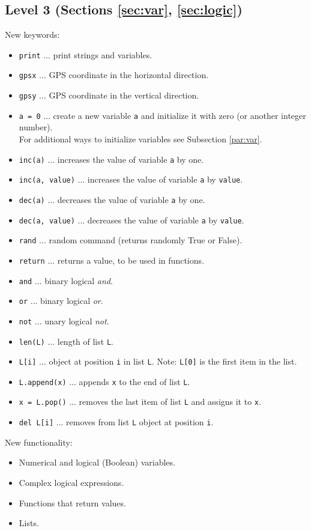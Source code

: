 \documentclass[article,A4,12pt]{llncs}
\begin{document}
\subsection{Level 3 (Sections \ref{sec:var}, \ref{sec:logic})}

New keywords:
\begin{itemize}
\item {\tt print} ... print strings and variables.
\item {\tt gpsx} ... GPS coordinate in the horizontal direction.
\item {\tt gpsy} ... GPS coordinate in the vertical direction.
\item {\tt a = 0} ... create a new variable {\tt a} and initialize it with zero (or another 
      integer number).\\ For additional ways to initialize variables see Subsection \ref{par:var}.
\item {\tt inc(a)} ... increases the value of variable {\tt a} by one.
\item {\tt inc(a, value)} ... increases the value of variable {\tt a} by {\tt value}.
\item {\tt dec(a)} ... decreases the value of variable {\tt a} by one.
\item {\tt dec(a, value)} ... decreases the value of variable {\tt a} by {\tt value}.
\item {\tt rand} ... random command (returns randomly True or False).
\item {\tt return} ... returns a value, to be used in functions.
\item {\tt and} ... binary logical {\em and}.
\item {\tt or} ... binary logical {\em or}.
\item {\tt not} ... unary logical {\em not}.
\item {\tt len(L)} ... length of list {\tt L}.
\item {\tt L[i]} ... object at position {\tt i} in list {\tt L}. Note: {\tt L[0]} is the first item in the list.
\item {\tt L.append(x)} ... appends {\tt x} to the end of list {\tt L}.
\item {\tt x = L.pop()} ... removes the last item of list {\tt L} and assigns it to {\tt x}.
\item {\tt del L[i]} ... removes from list {\tt L} object at position {\tt i}. 
\end{itemize}
New functionality:
\begin{itemize}
\item Numerical and logical (Boolean) variables.
\item Complex logical expressions.
\item Functions that return values.
\item Lists.
\end{itemize}
\end{document}
